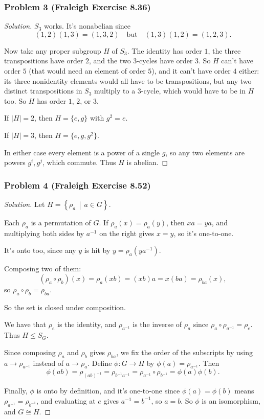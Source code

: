 \documentclass[11pt]{article}
\newcommand{\1}{\mathbf{1}}
\newcommand{\abs}[1]{\left\lvert#1\right\rvert}
\newcommand{\set}[1]{\left\{#1\right\}}
\newcommand{\given}{\,\middle\vert\,}
\theoremstyle{definition}
\newenvironment{solution}{\begin{proof}[Solution]}{\end{proof}}
\begin{document}
\subsubsection*{Problem 3 (Fraleigh Exercise 8.36)}
\begin{solution}
    $S_3$ works. It's nonabelian since
    $$(1,2)(1,3) = (1,3,2) \quad \text{but} \quad (1,3)(1,2) = (1,2,3).$$
    \par Now take any proper subgroup $H$ of $S_3$. The identity has order $1$, the three
    transpositions have order $2$, and the two $3$-cycles have order $3$. So $H$ can't have
    order $5$ (that would need an element of order $5$), and it can't have order $4$ either:
    its three nonidentity elements would all have to be transpositions, but any two distinct
    transpositions in $S_3$ multiply to a $3$-cycle, which would have to be in $H$ too. So
    $H$ has order $1$, $2$, or $3$.
    \par If $\abs{H} = 2$, then $H = \{e, g\}$ with $g^2 = e$.
    \par If $\abs{H} = 3$, then $H = \{e, g, g^2\}$.
    \par In either case every element is a power of a single $g$, so any two elements are
    powers $g^i, g^j$, which commute. Thus $H$ is abelian.
\end{solution}
\subsubsection*{Problem 4 (Fraleigh Exercise 8.52)}
\begin{solution}
    Let $H = \set{\rho_a \given a \in G}$.
    \par Each $\rho_a$ is a permutation of $G$. If $\rho_a(x) = \rho_a(y)$, then $xa = ya$, and
    multiplying both sides by $a^{-1}$ on the right gives $x = y$, so it's one-to-one.
    \par It's onto too, since any $y$ is hit by $y = \rho_a(ya^{-1})$.
    \par Composing two of them:
    $$(\rho_a \circ \rho_b)(x) = \rho_a(xb) = (xb)a = x(ba) = \rho_{ba}(x),$$
    so $\rho_a \circ \rho_b = \rho_{ba}$.
    \par So the set is closed under composition.
    \par We have that $\rho_e$ is the identity, and $\rho_{a^{-1}}$
    is the inverse of $\rho_a$ since $\rho_a \circ \rho_{a^{-1}} = \rho_e$. Thus $H \le S_G$.
    \par Since composing $\rho_a$ and $\rho_b$ gives $\rho_{ba}$, we fix the order of the
    subscripts by using $a \to \rho_{a^{-1}}$ instead of $a \to \rho_a$. Define
    $\phi : G \to H$ by $\phi(a) = \rho_{a^{-1}}$. Then
    $$\phi(ab) = \rho_{(ab)^{-1}} = \rho_{b^{-1}a^{-1}} = \rho_{a^{-1}} \circ \rho_{b^{-1}} = \phi(a)\phi(b).$$
    \par Finally, $\phi$ is onto by definition, and it's one-to-one since $\phi(a) = \phi(b)$
    means $\rho_{a^{-1}} = \rho_{b^{-1}}$, and evaluating at $e$ gives $a^{-1} = b^{-1}$, so
    $a = b$. So $\phi$ is an isomorphism, and $G \cong H$.
\end{solution}
\end{document}
